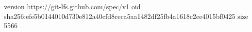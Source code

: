 version https://git-lfs.github.com/spec/v1
oid sha256:efe5b0144010d730e812a40cfd8ceca5aa1482df25fb4a1618c2ee4015bf0425
size 5566
